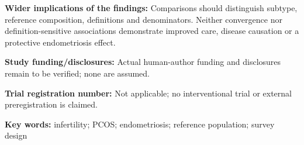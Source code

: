 \textbf{Wider implications of the findings:} Comparisons should distinguish subtype, reference composition, definitions and denominators. Neither convergence nor definition-sensitive associations demonstrate improved care, disease causation or a protective endometriosis effect.

\textbf{Study funding/disclosures:} Actual human-author funding and disclosures remain to be verified; none are assumed.

\textbf{Trial registration number:} Not applicable; no interventional trial or external preregistration is claimed.

\textbf{Key words:} infertility; PCOS; endometriosis; reference population; survey design
